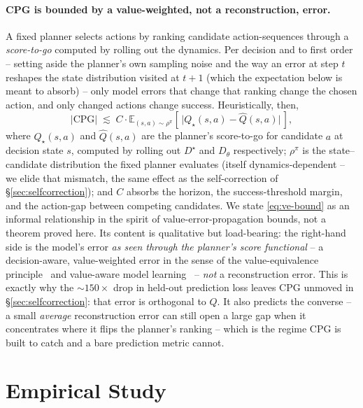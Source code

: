\documentclass[10pt,letterpaper]{article}
\begin{document}
\paragraph{CPG is bounded by a value-weighted, not a reconstruction, error.} A fixed planner selects actions by ranking candidate action-sequences through a \emph{score-to-go} computed by rolling out the dynamics. Per decision and to first order -- setting aside the planner's own sampling noise and the way an error at step $t$ reshapes the state distribution visited at $t{+}1$ (which the expectation below is meant to absorb) -- only model errors that change that ranking change the chosen action, and only changed actions change success. Heuristically, then,
\begin{equation}
  \lvert \mathrm{CPG} \rvert \;\lesssim\; C \cdot \mathbb{E}_{(s, a) \sim \rho^{\pi}}\!\left[\, \bigl\lvert Q_{\star}(s, a) - \hat{Q}(s, a) \bigr\rvert \,\right],
  \label{eq:ve-bound}
\end{equation}
where $Q_{\star}(s, a)$ and $\hat{Q}(s, a)$ are the planner's score-to-go for candidate $a$ at decision state $s$, computed by rolling out $D^\star$ and $D_\theta$ respectively; $\rho^{\pi}$ is the state--candidate distribution the fixed planner evaluates (itself dynamics-dependent -- we elide that mismatch, the same effect as the self-correction of \S\ref{sec:selfcorrection}); and $C$ absorbs the horizon, the success-threshold margin, and the action-gap between competing candidates. We state \eqref{eq:ve-bound} as an informal relationship in the spirit of value-error-propagation bounds, not a theorem proved here. Its content is qualitative but load-bearing: the right-hand side is the model's error \emph{as seen through the planner's score functional} -- a decision-aware, value-weighted error in the sense of the value-equivalence principle~\citep{grimm2020value,grimm2021proper} and value-aware model learning~\citep{farahmand2017value} -- \emph{not} a reconstruction error. This is exactly why the $\sim\!150\times$ drop in held-out prediction loss leaves CPG unmoved in \S\ref{sec:selfcorrection}: that error is orthogonal to $Q$. It also predicts the converse -- a small \emph{average} reconstruction error can still open a large gap when it concentrates where it flips the planner's ranking -- which is the regime CPG is built to catch and a bare prediction metric cannot.

\section{Empirical Study}
\label{sec:empirical}
\end{document}
